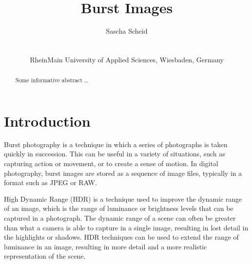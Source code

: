 \documentclass{egpubl}
\title[Burst Images]%
      {Burst Images}
\author[Sascha Scheid]
    {\parbox{\textwidth}
        {\centering 
			Sascha Scheid
        }
        \\
    {\parbox{\textwidth}
        {\centering RheinMain University of Applied Sciences, Wiesbaden, Germany\\
       }
    }
}
\begin{document}


\maketitle


\begin{abstract}
Some informative abstract \ldots
\blindtext
\end{abstract}  


\section{Introduction}
\label{sec:introduction}

Burst photography is a technique in which a series of photographs is taken quickly in succession.
This can be useful in a variety of situations, such as capturing action or movement, 
or to create a sense of motion. In digital photography, burst images are stored as a 
sequence of image files, typically in a format such as JPEG or RAW.

High Dynamic Range (HDR) is a technique used to improve the dynamic range of an image, 
which is the range of luminance or brightness levels that can be captured in a photograph. 
The dynamic range of a scene can often be greater than what a camera is able to capture 
in a single image, resulting in lost detail in the highlights or shadows. 
HDR techniques can be used to extend the range of luminance in an image, 
resulting in more detail and a more realistic representation of the scene.
\end{document}

